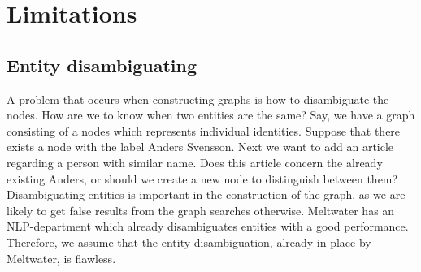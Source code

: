 \section{Limitations}
\subsection{Entity disambiguating}
A problem that occurs when constructing graphs is how to disambiguate the nodes. How are we to know when two entities are the same? Say, we have a graph consisting of a nodes which represents individual identities. Suppose that there exists a node with the label Anders Svensson. Next we want to add an article regarding a person with similar name. Does this article concern the already existing Anders, or should we create a new node to distinguish between them? Disambiguating entities is important in the construction of the graph, as we are likely to get false results from the graph searches otherwise. Meltwater has an NLP-department which already disambiguates entities with a good performance. Therefore, we assume that the entity disambiguation, already in place by Meltwater, is flawless. 